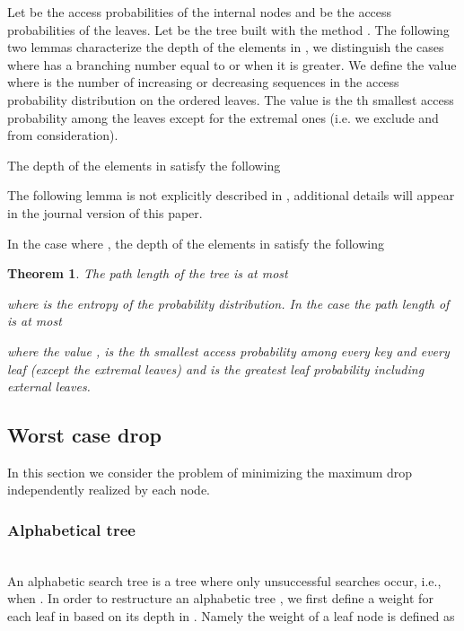 \documentclass{llncs}\usepackage[english]{babel}
\newtheorem{thm}{Theorem}
\begin{document}
Let  be the access probabilities of the internal nodes and  be the access probabilities of the leaves. Let  be the tree built with the method \cite{nearoptbtree}. The following two lemmas characterize the depth of the elements in , we distinguish the cases where  has a branching number equal to  or when it is greater. We define the value  where  is the number of increasing or decreasing sequences in the access probability distribution on the ordered leaves. The value  is the th smallest access probability among the leaves except for the extremal ones (i.e. we exclude  and  from consideration).



\begin{lemma}
\label{depthUB-Btrees}
The depth of the elements in  satisfy the following
\vspace{-0.2cm}

\end{lemma}

The following lemma is not explicitly described in \cite{nearoptbtree}, additional details will appear in the journal version of this paper.

\begin{lemma}
\label{depthUB-BST}
In the case where , the depth of the elements in  satisfy the following 
\vspace{-0.2cm}

\end{lemma}

\begin{thm}
\label{UB-WADS}
The path length of the tree  is at most
\vspace{-0.2cm}
 
where  is the entropy of the probability distribution.  In the case  the path length of  is at most
\vspace{-0.2cm}

where the value ,  is the th smallest access probability among every key and every leaf (except the extremal leaves) and  is the greatest leaf probability including external leaves.
\end{thm}

\subsection{Worst case drop}
\label{worstcasesection}
In this section we consider the problem of minimizing the maximum drop independently realized by each node.
\subsubsection{Alphabetical tree}
~\\An alphabetic search tree is a tree where only unsuccessful searches occur, i.e., when . In order to restructure an alphabetic tree , we first define a weight for each leaf in  based on its depth in . Namely the weight of a leaf node  is defined as
\vspace{-0.2cm}
\end{document}
